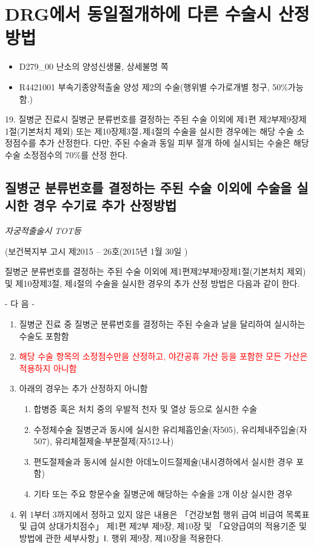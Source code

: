 \section{DRG에서 동일절개하에 다른 수술시 산정방법}
{
\begin{itemize}\tightlist
\item[\dsjuridical] D279\_00 난소의 양성신생물, 상세불명 쪽
\item[\dsmedical] R4421001 부속기종양적출술 양성 제2의 수술(행위별 수가로개별 청구, 50\%가능함.)
\end{itemize}
}
{
19. 질병군 진료시 질병군 분류번호를 결정하는 주된 수술 이외에 제1편 제2부제9장제1절(기본처치 제외) 또는 제10장제3절․제4절의 수술을 실시한 경우에는 해당 수술 소정점수를 추가 산정한다. 다만, 주된 수술과 동일 피부 절개 하에 실시되는 수술은 해당 수술 소정점수의 70\%를 산정 한다.
}

\subsection{질병군 분류번호를 결정하는 주된 수술 이외에 수술을 실시한 경우 수기료 추가 산정방법}
\emph{자궁적출술시 TOT등}\par
(보건복지부 고시 제2015 – 26호(2015년 1월 30일 )\par
질병군 분류번호를 결정하는 주된 수술 이외에 제1편제2부제9장제1절(기본처치 제외) 및 제10장제3절, 제4절의 수술을 실시한 경우의 추가 산정 방법은 다음과 같이 한다.\par
- 다 음 -
\begin{enumerate}[1.]\tightlist
\item 질병군 진료 중 질병군 분류번호를 결정하는 주된 수술과 날을 달리하여 실시하는 수술도 포함함
\item \textcolor{red}{해당 수술 항목의 소정점수만을 산정하고, 야간\bullet 공휴 가산 등을 포함한 모든 가산은 적용하지 아니함}
\item 아래의 경우는 추가 산정하지 아니함
	\begin{enumerate}\tightlist
	\item 합병증 혹은 처치 중의 우발적 천자 및 열상 등으로 실시한 수술
	\item 수정체수술 질병군과 동시에 실시한 유리체흡인술(자505), 유리체내주입술(자507), 유리체절제술-부분절제(자512-나)
	\item 편도절제술과 동시에 실시한 아데노이드절제술(내시경하에서 실시한 경우 포함)
	\item 기타 또는 주요 항문수술 질병군에 해당하는 수술을 2개 이상 실시한 경우
	\end{enumerate}
\item  위 1부터 3까지에서 정하고 있지 않은 내용은 「건강보험 행위 급여\bullet {} 비급여 목록표 및 급여 상대가치점수」 제1편 제2부 제9장, 제10장 및 「요양급여의 적용기준 및 방법에 관한 세부사항」Ⅰ. 행위 제9장, 제10장을 적용한다.
\end{enumerate}